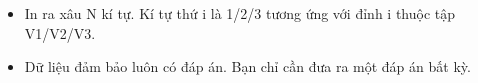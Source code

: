 \begin{itemize}
	\item     In ra xâu N kí tự. Kí tự thứ i là 1/2/3 tương ứng với đỉnh i thuộc tập V1/V2/V3.   
	\item     Dữ liệu đảm bảo luôn có đáp án. Bạn chỉ cần đưa ra một đáp án bất kỳ.   
\end{itemize}
